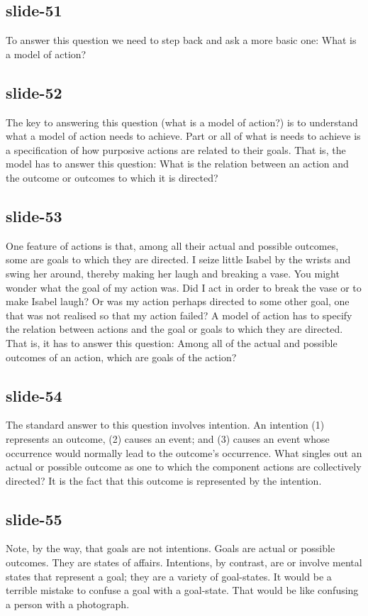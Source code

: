 \documentclass[12pt,\papersize]{extarticle}
\begin{document}
\subsection{slide-51}
To answer this question we need to step back and ask a more basic one: What is a model of action?
 
 
\subsection{slide-52}
The key to answering this question (what is a model of action?) is to understand what a model of action needs to achieve. Part or all of what is needs to achieve is a specification of how purposive actions are related to their goals. That is, the model has to answer this question: What is the relation between an action and the outcome or outcomes to which it is directed?
 
 
\subsection{slide-53}
One feature of actions is that, among all their actual and possible outcomes, some are goals to which they are directed. I seize little Isabel by the wrists and swing her around, thereby making her laugh and breaking a vase. You might wonder what the goal of my action was. Did I act in order to break the vase or to make Isabel laugh? Or was my action perhaps directed to some other goal, one that was not realised so that my action failed?
A model of action has to specify the relation between actions and the goal or goals to which they are directed. That is, it has to answer this question: Among all of the actual and possible outcomes of an action, which are goals of the action?
 
 
\subsection{slide-54}
The standard answer to this question involves intention. An intention (1) represents an outcome, (2) causes an event; and (3) causes an event whose occurrence would normally lead to the outcome’s occurrence. What singles out an actual or possible outcome as one to which the component actions are collectively directed? It is the fact that this outcome is represented by the intention.
 
 
\subsection{slide-55}
Note, by the way, that goals are not intentions. Goals are actual or possible outcomes. They are states of affairs. Intentions, by contrast, are or involve mental states that represent a goal; they are a variety of goal-states. It would be a terrible mistake to confuse a goal with a goal-state. That would be like confusing a person with a photograph.
 
\end{document}
